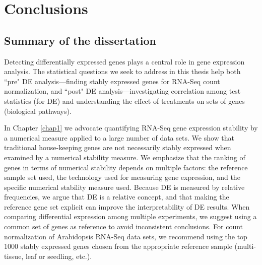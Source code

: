 \pagebreak
\newpage

\section{Conclusions}\label{ch:conclusion}

\subsection{Summary of the dissertation}
Detecting differentially expressed genes plays a central role in gene expression analysis. The 
statistical questions we seek to address in this thesis help both ``pre" DE analysis---finding 
stably expressed genes for RNA-Seq count normalization, and ``post" DE analysis---investigating 
correlation among test statistics (for DE) and understanding the effect of treatments on sets of 
genes (biological pathways).

In Chapter \ref{chap1} we advocate quantifying RNA-Seq gene expression stability by a numerical 
measure applied to a large number of data sets. We show that traditional house-keeping genes are 
not necessarily stably expressed when examined by a numerical stability measure. 
We emphasize that the ranking of genes in terms of numerical stability depends on multiple factors: 
the reference sample set used, the technology used for measuring gene expression, and the specific 
numerical stability measure used. Because DE is measured by relative frequencies, we argue that DE 
is a relative concept, and that making the reference gene set explicit can improve the 
interpretability of DE results.  When comparing differential expression among multiple experiments, 
we suggest using a common set of genes as reference to avoid inconsistent conclusions. For count 
normalization of Arabidopsis RNA-Seq data sets,  we recommend  using the top 1000 stably expressed 
genes chosen from the appropriate reference sample (multi-tissue, leaf or seedling, etc.).

